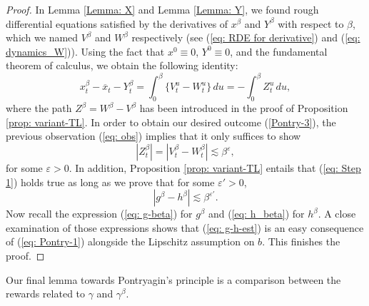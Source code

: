 \documentclass[12pt,reqno]{amsart}
\numberwithin{equation}{section}  %
\newcommand{\1}{{\bf 1}}
\newcommand{\2}{{\bf 2}}
\newcommand{\ga}{\gamma}
\theoremstyle{remark}
\theoremstyle{remark}
\begin{document}
\begin{proof}
In Lemma \ref{Lemma: X} and Lemma \ref{Lemma: Y}, we found rough differential equations satisfied by the derivatives of $x^{\beta}$ and $Y^{\beta}$ with respect to $\beta$, which we named $V^{\beta}$ and $W^{\beta}$ respectively (see (\ref{eq: RDE for derivative}) and (\ref{eq: dynamics_W})). Using the fact that $x^{0}\equiv 0$, $Y^{0}\equiv 0$, and the fundamental theorem of calculus, we obtain the following identity:
\begin{equation}
   \label{eq: obs} x^{\beta}_{t}-\overline{x}_{t}-Y^{\beta}_{t}=\int_{0}^{\beta}\{V^{u}_{t}-W^{u}_{t}\}\,du=-\int_{0}^{\beta}Z_{t}^{u}\,du,
\end{equation}
where the path $Z^{\beta}=W^{\beta}-V^{\beta}$ has been introduced in the proof of Proposition \ref{prop: variant-TL}.
In order to obtain our desired outcome (\ref{Pontry-3}), the previous observation (\ref{eq: obs}) implies that it only suffices to show 
\begin{equation} \label{eq: Step 1}
|Z^{\beta}_{t}|=|V^{\beta}_{t}-W^{\beta}_{t}|\lesssim \beta^{\varepsilon},
\end{equation}
for some $\varepsilon>0$. In addition, Proposition \ref{prop: variant-TL} entails that (\ref{eq: Step 1}) holds true as long as we prove that for some $\varepsilon'>0$,
\begin{equation}\label{eq: g-h-est}
    |g^{\beta}-h^{\beta}|\lesssim \beta^{\varepsilon'}.
\end{equation}
Now recall the expression (\ref{eq: g-beta}) for $g^{\beta}$ and (\ref{eq: h_beta}) for $h^{\beta}$. A close examination of those expressions shows that (\ref{eq: g-h-est}) is an easy consequence of (\ref{eq: Pontry-1}) alongside the Lipschitz assumption on $b$. This finishes the proof.\end{proof}
Our final lemma towards Pontryagin's principle is a comparison between the rewards related to $\ga$ and $\ga^{\beta}$.
\end{document}
